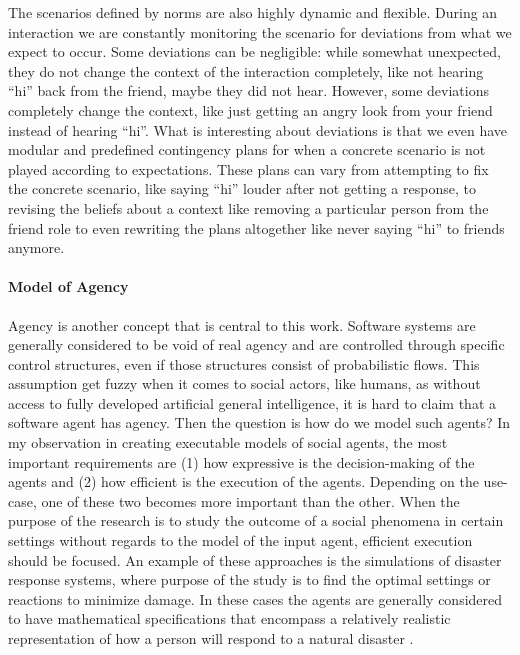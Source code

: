 The scenarios defined by norms are also highly dynamic and flexible. During an interaction we are constantly monitoring the scenario for deviations from what we expect to occur. Some deviations can be negligible: while somewhat unexpected, they do not change the context of the interaction completely, like not hearing ``hi'' back from the friend, maybe they did not hear. However, some deviations completely change the context, like just getting an angry look from your friend instead of hearing ``hi''. What is interesting about deviations is that we even have modular and predefined contingency plans for when a concrete scenario is not played according to expectations. These plans can vary from attempting to fix the concrete scenario, like saying ``hi'' louder after not getting a response, to revising the beliefs about a context like removing a particular person from the friend role to even rewriting the plans altogether like never saying ``hi'' to friends anymore.



\paragraph{Model of Agency}
Agency is another concept that is central to this work. Software systems are generally considered to be void of real agency and are controlled through specific control structures, even if those structures consist of probabilistic flows. This assumption get fuzzy when it comes to social actors, like humans, as without access to fully developed artificial general intelligence, it is hard to claim that a software agent has agency. Then the question is how do we model such agents? In my observation in creating executable models of social agents, the most important requirements are (1) how expressive is the decision-making of the agents and (2) how efficient is the execution of the agents. Depending on the use-case, one of these two becomes more important than the other. When the purpose of the research is to study the outcome of a social phenomena in certain settings without regards to the model of the input agent, efficient execution should be focused. An example of these approaches is the simulations of disaster response systems, where purpose of the study is to find the optimal settings or reactions to minimize damage. In these cases the agents are generally considered to have mathematical specifications that encompass a relatively realistic representation of how a person will respond to a natural disaster \cite{Something}.

